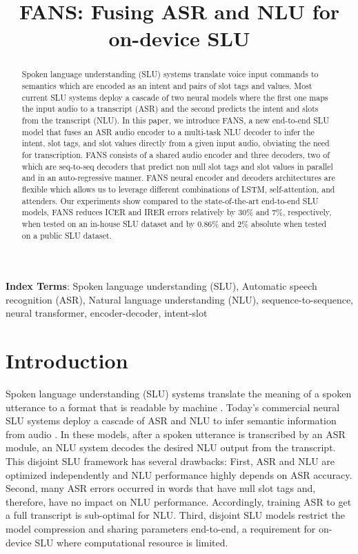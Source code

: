 \documentclass[a4paper]{article}
\title{  FANS: Fusing ASR and NLU for on-device  SLU }
\begin{document}
\maketitle
\begin{abstract}

Spoken language understanding (SLU) systems translate  voice input commands to   semantics which are encoded as  an intent and pairs of slot tags and values.  Most current SLU systems deploy a cascade of two  neural models where the first one  maps the input audio to a transcript (ASR) and the second  predicts the intent and slots from the transcript (NLU). In this paper, we introduce FANS, a new end-to-end  SLU model that fuses an ASR audio encoder to a multi-task NLU decoder to infer  the  intent, slot tags, and slot values directly from a given input audio, obviating the need for transcription. FANS consists of a shared audio  encoder and three decoders, two of which are seq-to-seq decoders that predict non null slot tags and slot values in parallel and in an auto-regressive manner. FANS neural encoder and decoders architectures are flexible which allows us to leverage different combinations of LSTM, self-attention, and  attenders. Our experiments show compared to the state-of-the-art  end-to-end SLU models, FANS reduces ICER and IRER errors relatively by 30\%  and 7\%, respectively, when tested on an in-house SLU dataset and by  0.86\% and 2\%  absolute when tested on a public SLU dataset.
\end{abstract}


\noindent\textbf{Index Terms}: Spoken language understanding (SLU), Automatic speech recognition (ASR), Natural language understanding (NLU), sequence-to-sequence, neural transformer, encoder-decoder, intent-slot 

\section{Introduction}

Spoken language understanding (SLU) systems  translate  the meaning of  a spoken utterance  to a format that is readable by machine \cite{wang2005spoken,TurDeMori2011,Bhargava2013EasyCI}. Today's commercial neural SLU systems deploy a cascade of ASR and NLU to infer semantic information from audio \cite{DBLP:journals/ftir/LarsonJ12}. In these models,  after a spoken utterance is transcribed by  an ASR module,  an NLU system decodes the desired NLU output from the transcript. This disjoint SLU framework has several drawbacks: First, ASR and NLU are optimized independently and NLU performance highly depends on ASR accuracy.  Second, many ASR errors occurred in  words that  have  null slot tags and, therefore, have no impact on NLU performance. Accordingly, training ASR to get a full transcript is sub-optimal for NLU. Third, disjoint SLU models restrict the model compression and sharing parameters end-to-end, a requirement for on-device SLU where  computational resource is limited. 
\end{document}
